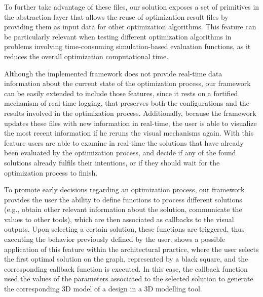 To further take advantage of these files, our solution exposes a set of primitives in the abstraction layer that allows the reuse of optimization result files by providing them as input data for other optimization algorithms. This feature can be particularly relevant when testing different optimization algorithms in problems involving time-consuming simulation-based evaluation functions, as it reduces the overall optimization computational time.


Although the implemented framework does not provide real-time data information about the current state of the optimization process, our framework can be easily extended to include those features, since it rests on a fortified mechanism of real-time logging, that preserves both the configurations and the results involved in the optimization process. Additionally, because the framework updates these files with new information in real-time, the user is able to visualize the most recent information if he reruns the visual mechanisms again. With this feature users are able to examine in real-time the solutions that have already been evaluated by the optimization process, and decide if any of the found solutions already fulfils their intentions, or if they should wait for the optimization process to finish. 

To promote early decisions regarding an optimization process, our framework provides the user the ability to define functions to process different solutions (e.g., obtain other relevant information about the solution, communicate the values to other tools), which are then associated as callbacks to the visual outputs. Upon selecting a certain solution, these functions are triggered, thus executing the behavior previously defined by the user.  shows a possible application of this feature within the architectural practice, where the user selects the first optimal solution on the graph, represented by a black square, and the corresponding callback function is executed. In this case, the callback function used the values of the parameters associated to the selected solution to generate the corresponding 3D model of a  design in a 3D modelling tool. 

